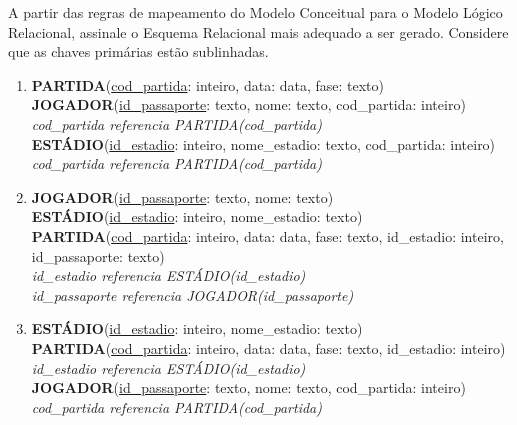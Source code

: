\documentclass[12pt,a4paper]{article}
\begin{document}
\begin{enumerate}
\begin{center}
\end{center}

A partir das regras de mapeamento do Modelo Conceitual para o Modelo Lógico Relacional, assinale o Esquema Relacional mais adequado a ser gerado. Considere que as chaves primárias estão sublinhadas.

\begin{enumerate}[label=\Alph*]
    \item \textbf{PARTIDA}(\underline{cod\_partida}: inteiro, data: data, fase: texto) \\
    \textbf{JOGADOR}(\underline{id\_passaporte}: texto, nome: texto, cod\_partida: inteiro) \\
    \textit{cod\_partida referencia PARTIDA(cod\_partida)} \\
    \textbf{ESTÁDIO}(\underline{id\_estadio}: inteiro, nome\_estadio: texto, cod\_partida: inteiro) \\
    \textit{cod\_partida referencia PARTIDA(cod\_partida)}
    
    \item \textbf{JOGADOR}(\underline{id\_passaporte}: texto, nome: texto) \\
    \textbf{ESTÁDIO}(\underline{id\_estadio}: inteiro, nome\_estadio: texto) \\
    \textbf{PARTIDA}(\underline{cod\_partida}: inteiro, data: data, fase: texto, id\_estadio: inteiro, id\_passaporte: texto) \\
    \textit{id\_estadio referencia ESTÁDIO(id\_estadio)} \\
    \textit{id\_passaporte referencia JOGADOR(id\_passaporte)}
    
    \item \textbf{ESTÁDIO}(\underline{id\_estadio}: inteiro, nome\_estadio: texto) \\
    \textbf{PARTIDA}(\underline{cod\_partida}: inteiro, data: data, fase: texto, id\_estadio: inteiro) \\
    \textit{id\_estadio referencia ESTÁDIO(id\_estadio)} \\
    \textbf{JOGADOR}(\underline{id\_passaporte}: texto, nome: texto, cod\_partida: inteiro) \\
    \textit{cod\_partida referencia PARTIDA(cod\_partida)}
    

\end{enumerate}
\end{enumerate}
\end{document}
